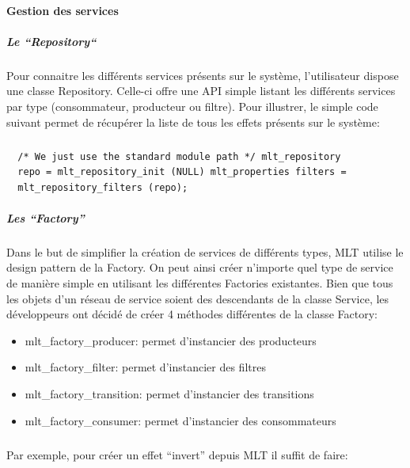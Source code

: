 \paragraph{Gestion des services}

\subparagraph{Le ``Repository``}

\subparagraph{}

Pour connaitre les différents services présents sur le système,
l'utilisateur dispose une classe Repository. Celle-ci offre une
API simple listant les différents services par type
(consommateur, producteur ou filtre).  Pour illustrer, le simple code
suivant permet de récupérer la liste de tous les effets présents sur
le système:

\subparagraph{}

\begin{lstlisting}
  /* We just use the standard module path */ mlt_repository
  repo = mlt_repository_init (NULL) mlt_properties filters =
  mlt_repository_filters (repo);
\end{lstlisting}

\subparagraph{Les ``Factory''}

\subparagraph{}

Dans le but de simplifier la création de services de différents types,
MLT utilise le design pattern de la Factory. On peut ainsi
créer n'importe quel type de service de manière simple en utilisant les
différentes Factories existantes. Bien que tous les objets d'un réseau
de service soient des descendants de la classe Service, les développeurs
ont décidé de créer 4 méthodes différentes de la classe Factory:

\begin{itemize}

  \item {mlt\_factory\_producer: permet d'instancier des producteurs}

  \item {mlt\_factory\_filter: permet d'instancier des filtres}

  \item {mlt\_factory\_transition: permet d'instancier des transitions}

  \item {mlt\_factory\_consumer: permet d'instancier des consommateurs}

\end{itemize}

\subparagraph{}

Par exemple, pour créer un effet ``invert'' depuis MLT
il suffit de faire:

